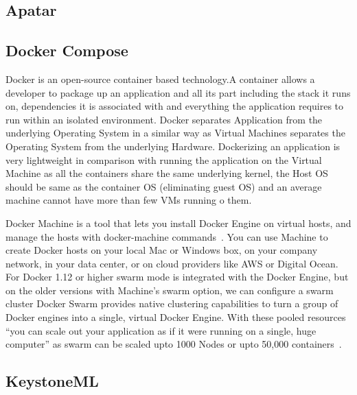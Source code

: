 \subsection{Apatar}

\pv

\subsection{Docker Compose}

    Docker is an open-source container based technology.A container
    allows a developer to package up an application and all its part
    including the stack it runs on, dependencies it is associated with
    and everything the application requires to run within an isolated
    environment. Docker separates Application from the underlying
    Operating System in a similar way as Virtual Machines separates
    the Operating System from the underlying Hardware. Dockerizing an
    application is very lightweight in comparison with running the
    application on the Virtual Machine as all the containers share the
    same underlying kernel, the Host OS should be same as the
    container OS (eliminating guest OS) and an average machine cannot
    have more than few VMs running o them.

    Docker Machine is a tool that lets you install Docker Engine on
    virtual hosts, and manage the hosts with docker-machine
    commands~\cite{docker-book}. You can use Machine to create Docker
    hosts on your local Mac or Windows box, on your company network,
    in your data center, or on cloud providers like AWS or Digital
    Ocean. For Docker 1.12 or higher swarm mode is integrated with the
    Docker Engine, but on the older versions with Machine's swarm
    option, we can configure a swarm cluster Docker Swarm provides
    native clustering capabilities to turn a group of Docker engines
    into a single, virtual Docker Engine. With these pooled resources
    ``you can scale out your application as if it were running on a
    single, huge computer'' as swarm can be scaled upto 1000 Nodes or
    upto 50,000 containers~\cite{www-docker}.

    \pv
    
\subsection{KeystoneML}
    
